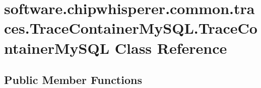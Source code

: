 \hypertarget{classsoftware_1_1chipwhisperer_1_1common_1_1traces_1_1TraceContainerMySQL_1_1TraceContainerMySQL}{}\section{software.\+chipwhisperer.\+common.\+traces.\+Trace\+Container\+My\+S\+Q\+L.\+Trace\+Container\+My\+S\+Q\+L Class Reference}
\label{classsoftware_1_1chipwhisperer_1_1common_1_1traces_1_1TraceContainerMySQL_1_1TraceContainerMySQL}
\subsection*{Public Member Functions}
